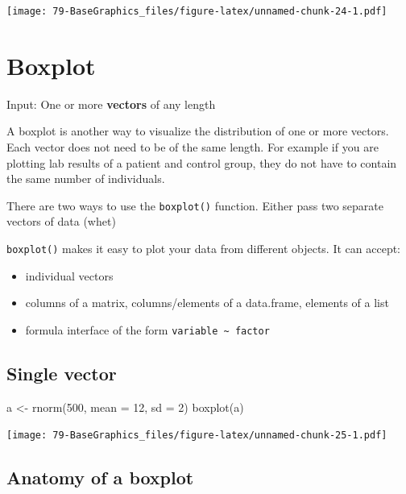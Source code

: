 \documentclass[
]{book}
\newenvironment{Shaded}{\begin{snugshade}}{\end{snugshade}}
\newcommand{\AttributeTok}[1]{\textcolor[rgb]{0.77,0.63,0.00}{#1}}
\newcommand{\DecValTok}[1]{\textcolor[rgb]{0.00,0.00,0.81}{#1}}
\newcommand{\FunctionTok}[1]{\textcolor[rgb]{0.00,0.00,0.00}{#1}}
\newcommand{\NormalTok}[1]{#1}
\newcommand{\OtherTok}[1]{\textcolor[rgb]{0.56,0.35,0.01}{#1}}
\providecommand{\tightlist}{%
  \setlength{\itemsep}{0pt}\setlength{\parskip}{0pt}}
\begin{document}
\texttt{[image: 79-BaseGraphics\_files/figure-latex/unnamed-chunk-24-1.pdf]}

\hypertarget{boxplot}{%
\section{Boxplot}\label{boxplot}}

Input: One or more \textbf{vectors} of any length

A boxplot is another way to visualize the distribution of one or more vectors. Each vector does not need to be of the same length. For example if you are plotting lab results of a patient and control group, they do not have to contain the same number of individuals.

There are two ways to use the \texttt{boxplot()} function. Either pass two separate vectors of data (whet)

\texttt{boxplot()} makes it easy to plot your data from different objects. It can accept:

\begin{itemize}
\tightlist
\item
  individual vectors
\item
  columns of a matrix, columns/elements of a data.frame, elements of a list
\item
  formula interface of the form \texttt{variable\ \textasciitilde{}\ factor}
\end{itemize}

\hypertarget{single-vector-1}{%
\subsection{Single vector}\label{single-vector-1}}

\begin{Shaded}
\begin{Highlighting}[]
\NormalTok{a }\OtherTok{\textless{}{-}} \FunctionTok{rnorm}\NormalTok{(}\DecValTok{500}\NormalTok{, }\AttributeTok{mean =} \DecValTok{12}\NormalTok{, }\AttributeTok{sd =} \DecValTok{2}\NormalTok{)}
\FunctionTok{boxplot}\NormalTok{(a)}
\end{Highlighting}
\end{Shaded}

\texttt{[image: 79-BaseGraphics\_files/figure-latex/unnamed-chunk-25-1.pdf]}

\hypertarget{anatomy-of-a-boxplot}{%
\subsection{Anatomy of a boxplot}\label{anatomy-of-a-boxplot}}
\end{document}
